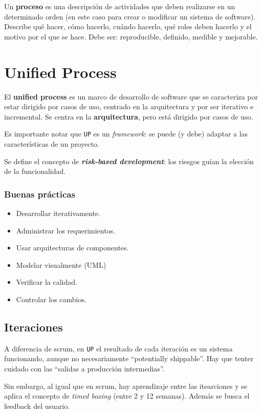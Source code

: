 \documentclass[]{article}
\begin{document}
Un \textbf{proceso} es una descripción de actividades que deben realizarse en un determinado orden (en este caso para crear o modificar un sistema de software). Describe qué hacer, cómo hacerlo, cuándo hacerlo, qué roles deben hacerlo y el motivo por el que se hace. Debe ser: reproducible, definido, medible y mejorable.


\section{Unified Process}
El \textbf{unified process} es un marco de desarrollo de software que se caracteriza por estar dirigido por casos de uso, centrado en la arquitectura y por ser iterativo e incremental. Se centra en la \textbf{arquitectura}, pero está dirigido por casos de uso.

Es importante notar que \texttt{UP} es un \emph{framework}: se puede (y debe) adaptar a las características de un proyecto.

Se define el concepto de \textbf{\emph{risk-based development}}: los riesgos guían la elección de la funcionalidad.

\subsubsection{Buenas prácticas}
\begin{itemize}
	\item Desarrollar iterativamente.
	\item Administrar los requerimientos.
	\item Usar arquitecturas de componentes.
	\item Modelar visualmente (UML)
	\item Verificar la calidad.
	\item Controlar los cambios.
\end{itemize}


\subsection{Iteraciones}
A diferencia de scrum, en \texttt{UP} el resultado de cada iteración es un sistema funcionando, aunque no necesariamente ``potentially shippable''. Hay que tenter cuidado con las ``salidas a producción intermedias''.

Sin embargo, al igual que en scrum, hay aprendizaje entre las itearciones y se aplica el concepto de \emph{timed boxing} (entre 2 y 12 semanas). Además se busca el feedback del usuario.
\end{document}
